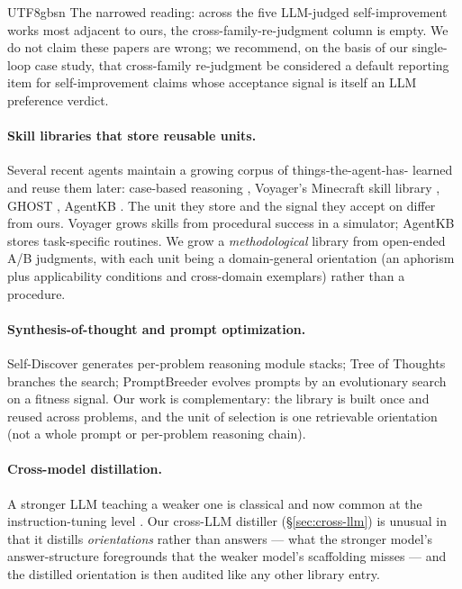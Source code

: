 \documentclass{article}
\begin{document}
\begin{CJK*}{UTF8}{gbsn}
The narrowed reading: across the five LLM-judged self-improvement
works most adjacent to ours, the cross-family-re-judgment column
is empty. We do not claim these papers are wrong; we recommend,
on the basis of our single-loop case study, that cross-family
re-judgment be considered a default reporting item for
self-improvement claims whose acceptance signal is itself an LLM
preference verdict.

\paragraph{Skill libraries that store reusable units.} Several
recent agents maintain a growing corpus of things-the-agent-has-
learned and reuse them later: case-based reasoning
\citep{aamodt1994cbr}, Voyager's Minecraft skill library
\citep{wang2023voyager}, GHOST \citep{zhu2023ghost}, AgentKB
\citep{sumers2024agentkb}. The unit they store and the signal
they accept on differ from ours. Voyager grows skills from
procedural success in a simulator; AgentKB stores task-specific
routines. We grow a \emph{methodological} library from open-ended
A/B judgments, with each unit being a domain-general orientation
(an aphorism plus applicability conditions and cross-domain
exemplars) rather than a procedure.

\paragraph{Synthesis-of-thought and prompt optimization.}
Self-Discover \citep{zhou2024selfdiscover} generates per-problem
reasoning module stacks; Tree of Thoughts \citep{yao2023tot}
branches the search; PromptBreeder \citep{fernando2023promptbreeder}
evolves prompts by an evolutionary search on a fitness signal.
Our work is complementary: the library is built once and reused
across problems, and the unit of selection is one retrievable
orientation (not a whole prompt or per-problem reasoning chain).

\paragraph{Cross-model distillation.} A stronger LLM teaching a
weaker one is classical \citep{hinton2015distillation} and now
common at the instruction-tuning level
\citep{taori2023alpaca,peng2024evolinstruct}. Our cross-LLM
distiller (\S\ref{sec:cross-llm}) is unusual in that it distills
\emph{orientations} rather than answers --- what the stronger
model's answer-structure foregrounds that the weaker model's
scaffolding misses --- and the distilled orientation is then
audited like any other library entry.


\end{CJK*}
\end{document}
